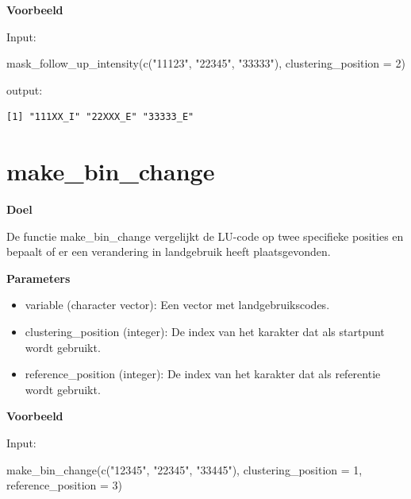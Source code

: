 \documentclass[twoside]{extreport}
\newenvironment{Shaded}{\begin{snugshade}}{\end{snugshade}}
\newcommand{\AttributeTok}[1]{\textcolor[rgb]{0.40,0.45,0.13}{#1}}
\newcommand{\DecValTok}[1]{\textcolor[rgb]{0.68,0.00,0.00}{#1}}
\newcommand{\FunctionTok}[1]{\textcolor[rgb]{0.28,0.35,0.67}{#1}}
\newcommand{\NormalTok}[1]{\textcolor[rgb]{0.00,0.23,0.31}{#1}}
\newcommand{\StringTok}[1]{\textcolor[rgb]{0.13,0.47,0.30}{#1}}
\providecommand{\tightlist}{%
  \setlength{\itemsep}{0pt}\setlength{\parskip}{0pt}}\usepackage{longtable,booktabs,array}
\begin{document}
\textbf{Voorbeeld}

Input:

\begin{Shaded}
\begin{Highlighting}[]
\FunctionTok{mask\_follow\_up\_intensity}\NormalTok{(}\FunctionTok{c}\NormalTok{(}\StringTok{"11123"}\NormalTok{, }\StringTok{"22345"}\NormalTok{, }\StringTok{"33333"}\NormalTok{), }\AttributeTok{clustering\_position =} \DecValTok{2}\NormalTok{)}
\end{Highlighting}
\end{Shaded}

output:

\begin{verbatim}
[1] "111XX_I" "22XXX_E" "33333_E"
\end{verbatim}

\section{make\_bin\_change}\label{make_bin_change}

\textbf{Doel}

De functie make\_bin\_change vergelijkt de LU-code op twee specifieke
posities en bepaalt of er een verandering in landgebruik heeft
plaatsgevonden.

\textbf{Parameters}

\begin{itemize}
\tightlist
\item
  variable (character vector): Een vector met landgebruikscodes.
\item
  clustering\_position (integer): De index van het karakter dat als
  startpunt wordt gebruikt.
\item
  reference\_position (integer): De index van het karakter dat als
  referentie wordt gebruikt.
\end{itemize}

\textbf{Voorbeeld}

Input:

\begin{Shaded}
\begin{Highlighting}[]
\FunctionTok{make\_bin\_change}\NormalTok{(}\FunctionTok{c}\NormalTok{(}\StringTok{"12345"}\NormalTok{, }\StringTok{"22345"}\NormalTok{, }\StringTok{"33445"}\NormalTok{), }\AttributeTok{clustering\_position =} \DecValTok{1}\NormalTok{, }\AttributeTok{reference\_position =} \DecValTok{3}\NormalTok{)}
\end{Highlighting}
\end{Shaded}
\end{document}
